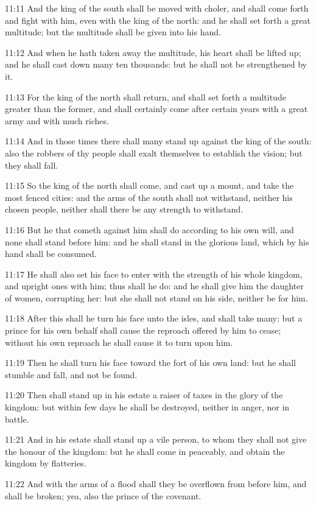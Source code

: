 11:11 And the king of the south shall be moved with choler, and shall
come forth and fight with him, even with the king of the north: and he
shall set forth a great multitude; but the multitude shall be given
into his hand.

11:12 And when he hath taken away the multitude, his heart shall be
lifted up; and he shall cast down many ten thousands: but he shall not
be strengthened by it.

11:13 For the king of the north shall return, and shall set forth a
multitude greater than the former, and shall certainly come after
certain years with a great army and with much riches.

11:14 And in those times there shall many stand up against the king of
the south: also the robbers of thy people shall exalt themselves to
establish the vision; but they shall fall.

11:15 So the king of the north shall come, and cast up a mount, and
take the most fenced cities: and the arms of the south shall not
withstand, neither his chosen people, neither shall there be any
strength to withstand.

11:16 But he that cometh against him shall do according to his own
will, and none shall stand before him: and he shall stand in the
glorious land, which by his hand shall be consumed.

11:17 He shall also set his face to enter with the strength of his
whole kingdom, and upright ones with him; thus shall he do: and he
shall give him the daughter of women, corrupting her: but she shall
not stand on his side, neither be for him.

11:18 After this shall he turn his face unto the isles, and shall take
many: but a prince for his own behalf shall cause the reproach offered
by him to cease; without his own reproach he shall cause it to turn
upon him.

11:19 Then he shall turn his face toward the fort of his own land: but
he shall stumble and fall, and not be found.

11:20 Then shall stand up in his estate a raiser of taxes in the glory
of the kingdom: but within few days he shall be destroyed, neither in
anger, nor in battle.

11:21 And in his estate shall stand up a vile person, to whom they
shall not give the honour of the kingdom: but he shall come in
peaceably, and obtain the kingdom by flatteries.

11:22 And with the arms of a flood shall they be overflown from before
him, and shall be broken; yea, also the prince of the covenant.


